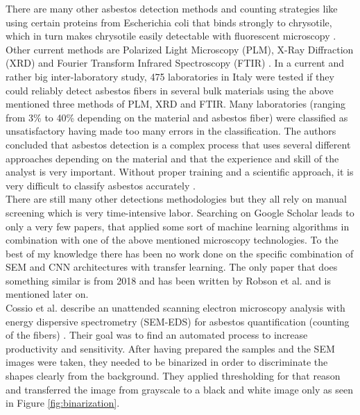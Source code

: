 There are many other asbestos detection methods and counting strategies like using certain proteins from Escherichia coli that binds strongly to chrysotile, which in turn makes chrysotile easily detectable with fluorescent microscopy \cite{kuroda2008detection}. Other current methods are Polarized Light Microscopy (PLM), X-Ray Diffraction (XRD) and Fourier Transform Infrared Spectroscopy (FTIR) \cite{campopiano2018inter}. In a current and rather big inter-laboratory study, 475 laboratories in Italy were tested if they could reliably detect asbestos fibers in several bulk materials using the above mentioned three methods of PLM, XRD and FTIR. Many laboratories (ranging from 3\% to 40\% depending on the material and asbestos fiber) were classified as unsatisfactory having made too many errors in the classification. The authors concluded that asbestos detection is a complex process that uses several different approaches depending on the material and that the experience and skill of the analyst is very important. Without proper training and a scientific approach, it is very difficult to classify asbestos accurately \cite{campopiano2018inter}. \\

There are still many other detections methodologies but they all rely on manual screening which is very time-intensive labor. Searching on Google Scholar leads to only a very few papers, that applied some sort of machine learning algorithms in combination with one of the above mentioned microscopy technologies. To the best of my knowledge there has been no work done on the specific combination of SEM and CNN architectures with transfer learning. The only paper that does something similar is from 2018 and has been written by Robson et al. \cite{robson2018fiac} and is mentioned later on. \\

Cossio et al. describe an unattended scanning electron microscopy analysis with energy dispersive spectrometry (SEM-EDS) for asbestos quantification (counting of the fibers) \cite{cossio2018innovative}. Their goal was to find an automated process to increase productivity and sensitivity. After having prepared the samples and the SEM images were taken, they needed to be binarized in order to discriminate the shapes clearly from the background. They applied thresholding for that reason and transferred the image from grayscale to a black and white image only as seen in Figure \ref{fig:binarization}.

